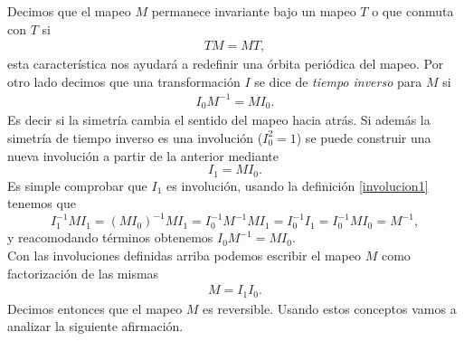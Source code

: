 Decimos que el mapeo $M$ permanece invariante bajo un mapeo $T$ o que conmuta con $T$ si 
\begin{eqnarray}
TM = MT,
\label{conmuta}
\end{eqnarray}
esta caracter\'istica nos ayudar\'a a redefinir una \'orbita peri\'odica del mapeo. Por otro lado decimos que una transformaci\'on $I$ se dice de \textit{tiempo inverso} para $M$ si 
\begin{eqnarray}
I_{0}M^{-1} = MI_{0}.
\label{involucion1}
\end{eqnarray}
Es decir si la simetr\'ia cambia el sentido del mapeo hacia atr\'as. Si adem\'as la simetr\'ia de tiempo inverso es una involuci\'on ($I_{0}^{2}=1$) se puede construir una nueva involuci\'on a partir de la anterior mediante 
\begin{equation}
I_{1} = MI_{0}.
\label{involucion2}
\end{equation}
Es simple comprobar que $I_{1}$ es involuci\'on, usando la definici\'on \ref{involucion1} tenemos que 
\begin{equation*}
I_{1}^{-1}MI_{1} = (MI_{0})^{-1}MI_{1} = I_{0}^{-1}M^{-1}MI_{1} = I_{0}^{-1}I_{1} = I^{-1}_{0}MI_{0}=M^{-1},
\end{equation*}
y reacomodando t\'erminos obtenemos $I_{0}M^{-1}= MI_{0}$.\\

 
Con las involuciones definidas arriba podemos escribir el mapeo $M$ como factorizaci\'on de las mismas \cite{Devaney3}
\begin{eqnarray}
M = I_{1}I_{0}.
\end{eqnarray}
Decimos entonces que el mapeo $M$ es reversible. Usando estos conceptos vamos a analizar la siguiente afirmaci\'on. \\

